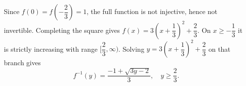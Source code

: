 Since $f(0)=f(-\dfrac{2}{3})=1$, the full function is not injective, hence not invertible. Completing the square gives $f(x)=3(x+\dfrac{1}{3})^2+\dfrac{2}{3}$. On $x\ge-\dfrac{1}{3}$ it is strictly increasing with range $[\dfrac{2}{3},\infty)$. Solving $y=3(x+\dfrac{1}{3})^2+\dfrac{2}{3}$ on that branch gives
\[\boxed{f^{-1}(y)=\dfrac{-1+\sqrt{3y-2}}{3},\quad y\ge\dfrac{2}{3}}.\]
